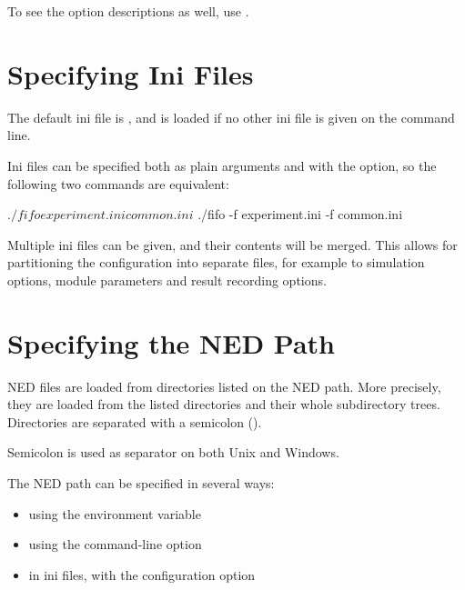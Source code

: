 To see the option descriptions as well, use .
    


\section{Specifying Ini Files}
\label{sec:run-sim:specifying-ini-files}

The default ini file is , and is
loaded if no other ini file is given on the command line.

Ini files can be specified both as plain arguments and with the 
option, so the following two commands are equivalent:

\begin{commandline}
$ ./fifo experiment.ini common.ini
$ ./fifo -f experiment.ini -f common.ini
\end{commandline}

Multiple ini files can be given, and their contents will be merged. This
allows for partitioning the configuration into separate files, for example
to simulation options, module parameters and result recording options.


\section{Specifying the NED Path}
\label{sec:run-sim:specifying-ned-path}

NED files are loaded from directories listed on the NED path. More precisely,
they are loaded from the listed directories and their whole subdirectory trees.
Directories are separated with a semicolon (\ttt{;}).

\begin{note}
Semicolon is used as separator on both Unix and Windows.
\end{note}

The NED path can be specified in several ways:
\begin{itemize}
  \item using the  environment variable
  \item using the  command-line option
  \item in ini files, with the  configuration option
\end{itemize}

